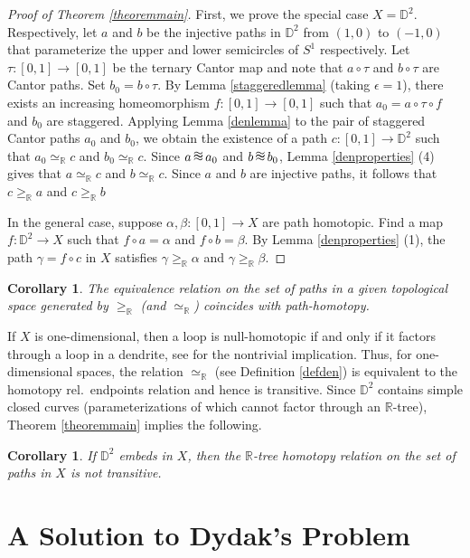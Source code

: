 \documentclass[12pt, leqno]{amsart}
\newcommand{\tripproxs}{\,\setbox0\hbox{$\approx$}%
\mbox{\makebox[0pt][l]{\raisebox{0.48\ht0}{$\approx$}}$\approx$}\,}
\newcommand{\ui}{[0,1]}
\newcommand{\den}{\simeq_{\bbr}}
\newcommand{\bbd}{\mathbb{D}}
\newcommand{\bbr}{\mathbb{R}}
\newtheorem{corollary}[theorem]{Corollary}
\theoremstyle{definition}\newtheorem{definition}[theorem]{Definition}
\begin{document}
\begin{proof}[Proof of Theorem \ref{theoremmain}]
First, we prove  the special case $X=\bbd^2$. Respectively, let $a$ and $b$ be the injective paths in $\bbd^2$ from $(1,0)$ to $(-1,0)$ that parameterize the upper and lower semicircles of $S^1$ respectively. Let $\tau:\ui\to\ui$ be the ternary Cantor map and note that $a\circ \tau$ and $b\circ \tau$ are Cantor paths. Set $b_0=b\circ \tau$. By Lemma \ref{staggeredlemma} (taking $\epsilon=1$), there exists an increasing homeomorphism $f:\ui\to \ui$ such that $a_0=a\circ \tau\circ f$ and $b_0$ are staggered. Applying Lemma \ref{denlemma} to the pair of staggered Cantor paths $a_0$ and $b_0$, we obtain the existence of a path $c:\ui\to \bbd^2$ such that $a_0\den c$ and $b_0\den c$. Since $a\tripproxs a_0$ and $b \tripproxs b_0$, Lemma \ref{denproperties} (4) gives that $a\den c$ and $b\den c$. Since $a$ and $b$ are injective paths, it follows that $c\geq_{\bbr}a$ and $c\geq_{\bbr}b$

In the general case, suppose $\alpha ,\beta :\ui\to X$ are path homotopic. Find a map $f:\bbd^2\to X$ such that $f\circ a=\alpha$ and $f\circ b=\beta$. By Lemma \ref{denproperties} (1), the path $\gamma =f\circ c$ in $X$ satisfies $\gamma\geq_{\bbr}\alpha$ and $\gamma\geq_{\bbr} \beta$.
\end{proof}

\begin{corollary}\label{corcoincideswithhomotopy}
The equivalence relation on the set of paths in a given topological space generated by $\geq_{\bbr}$ (and $\den$) coincides with path-homotopy.
\end{corollary}
 If $X$ is one-dimensional, then a loop is  null-homotopic if and only if it factors through a loop in a dendrite, see \cite[Theorem 3.7]{CConedim} for the nontrivial implication.  Thus, for one-dimensional spaces, the  relation $\den$ (see Definition \ref{defden}) is equivalent to the homotopy rel.\ endpoints relation and hence is transitive. Since $\bbd^2$ contains simple closed curves (parameterizations of which cannot factor through an $\bbr$-tree),  Theorem \ref{theoremmain} implies the following.

\begin{corollary}\label{corollarynottransitive}
If $\bbd^2$ embeds in $X$, then the $\bbr$-tree homotopy relation on the set of paths in $X$ is not transitive.
\end{corollary}

\section{A Solution to Dydak's Problem}\label{sec: Dydak's problem}
\end{document}
